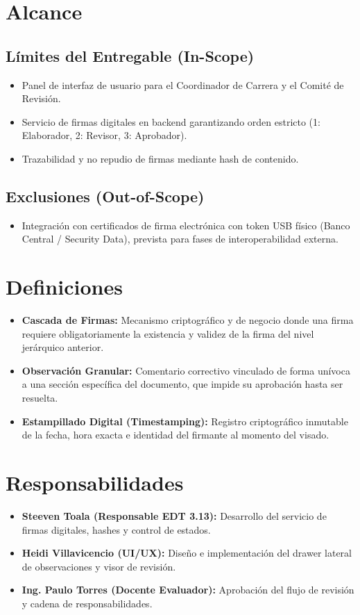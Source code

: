 \documentclass[12pt,a4paper]{article}
\begin{document}
\section{Alcance}
\subsection{Límites del Entregable (In-Scope)}
\begin{itemize}[leftmargin=1.5em, itemsep=2pt]
    \item Panel de interfaz de usuario para el Coordinador de Carrera y el Comité de Revisión.
    \item Servicio de firmas digitales en backend garantizando orden estricto (1: Elaborador, 2: Revisor, 3: Aprobador).
    \item Trazabilidad y no repudio de firmas mediante hash de contenido.
\end{itemize}
\subsection{Exclusiones (Out-of-Scope)}
\begin{itemize}[leftmargin=1.5em, itemsep=2pt]
    \item Integración con certificados de firma electrónica con token USB físico (Banco Central / Security Data), prevista para fases de interoperabilidad externa.
\end{itemize}

\section{Definiciones}
\begin{itemize}[leftmargin=1.5em, itemsep=2pt]
    \item \textbf{Cascada de Firmas:} Mecanismo criptográfico y de negocio donde una firma requiere obligatoriamente la existencia y validez de la firma del nivel jerárquico anterior.
    \item \textbf{Observación Granular:} Comentario correctivo vinculado de forma unívoca a una sección específica del documento, que impide su aprobación hasta ser resuelta.
    \item \textbf{Estampillado Digital (Timestamping):} Registro criptográfico inmutable de la fecha, hora exacta e identidad del firmante al momento del visado.
\end{itemize}

\section{Responsabilidades}
\begin{itemize}[leftmargin=1.5em, itemsep=2pt]
    \item \textbf{Steeven Toala (Responsable EDT 3.13):} Desarrollo del servicio de firmas digitales, hashes y control de estados.
    \item \textbf{Heidi Villavicencio (UI/UX):} Diseño e implementación del drawer lateral de observaciones y visor de revisión.
    \item \textbf{Ing. Paulo Torres (Docente Evaluador):} Aprobación del flujo de revisión y cadena de responsabilidades.
\end{itemize}
\end{document}
